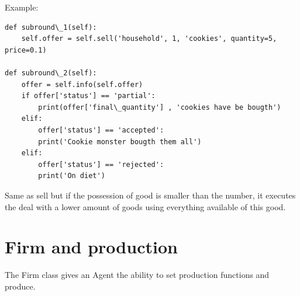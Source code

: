 \documentclass[letterpaper,10pt,english]{sphinxmanual}
\begin{document}
\begin{fulllineitems}
\begin{fulllineitems}
\begin{description}
\end{description}

Example:

\begin{Verbatim}[commandchars=\\\{\}]
def subround\_1(self):
    self.offer = self.sell('household', 1, 'cookies', quantity=5, price=0.1)

def subround\_2(self):
    offer = self.info(self.offer)
    if offer['status'] == 'partial':
        print(offer['final\_quantity'] , 'cookies have be bougth')
    elif:
        offer['status'] == 'accepted':
        print('Cookie monster bougth them all')
    elif:
        offer['status'] == 'rejected':
        print('On diet')
\end{Verbatim}

\end{fulllineitems}


\begin{fulllineitems}
\label{Trade:abce.Trade.sell_max_possible}
Same as sell but if the possession of good is smaller than the number,
it executes the deal with a lower amount of goods using everything
available of this good.

\end{fulllineitems}


\end{fulllineitems}



\chapter{Firm and production}
\label{Firm:module-firm}\label{Firm::doc}\label{Firm:firm-and-production}
The Firm class gives an Agent the ability to set production functions and
produce.
\end{document}
